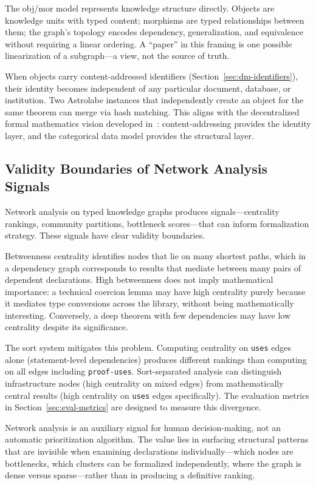 The obj/mor model represents knowledge structure directly. Objects are knowledge units with typed content; morphisms are typed relationships between them; the graph's topology encodes dependency, generalization, and equivalence without requiring a linear ordering. A ``paper'' in this framing is one possible linearization of a subgraph---a view, not the source of truth.

When objects carry content-addressed identifiers (Section~\ref{sec:dm-identifiers}), their identity becomes independent of any particular document, database, or institution. Two Astrolabe instances that independently create an object for the same theorem can merge via hash matching. This aligns with the decentralized formal mathematics vision developed in~\cite{LiParisSeverini2026}: content-addressing provides the identity layer, and the categorical data model provides the structural layer.


\subsection{Validity Boundaries of Network Analysis Signals}
\label{sec:disc-validity}

Network analysis on typed knowledge graphs produces signals---centrality rankings, community partitions, bottleneck scores---that can inform formalization strategy. These signals have clear validity boundaries.

Betweenness centrality identifies nodes that lie on many shortest paths, which in a dependency graph corresponds to results that mediate between many pairs of dependent declarations. High betweenness does not imply mathematical importance: a technical coercion lemma may have high centrality purely because it mediates type conversions across the library, without being mathematically interesting. Conversely, a deep theorem with few dependencies may have low centrality despite its significance.

The sort system mitigates this problem. Computing centrality on \texttt{uses} edges alone (statement-level dependencies) produces different rankings than computing on all edges including \texttt{proof-uses}. Sort-separated analysis can distinguish infrastructure nodes (high centrality on mixed edges) from mathematically central results (high centrality on \texttt{uses} edges specifically). The evaluation metrics in Section~\ref{sec:eval-metrics} are designed to measure this divergence.

Network analysis is an auxiliary signal for human decision-making, not an automatic prioritization algorithm. The value lies in surfacing structural patterns that are invisible when examining declarations individually---which nodes are bottlenecks, which clusters can be formalized independently, where the graph is dense versus sparse---rather than in producing a definitive ranking.


